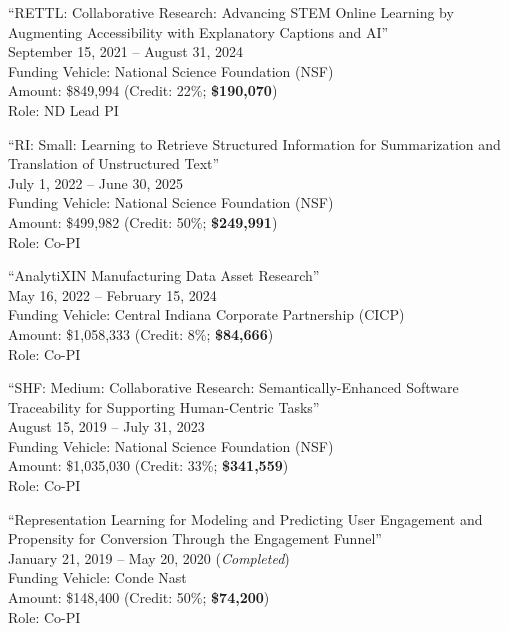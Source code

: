 \documentclass[10pt]{article}
\newenvironment{myindentpar}[1]%
{\begin{list}{}%
         {\setlength{\leftmargin}{#1}}%
         \item[]%
}
{\end{list}}
\newcounter{list}
\begin{document}
\begin{myindentpar}{0.75cm}
\hspace{-0.75cm}``RETTL: Collaborative Research: Advancing STEM Online Learning by Augmenting Accessibility with Explanatory Captions and AI'' \\
September 15, 2021 -- August 31, 2024 \\
Funding Vehicle: National Science Foundation (NSF) \\
Amount: \$849,994 (Credit: 22\%; \textbf{\$190,070}) \\
Role: {ND Lead PI}

\hspace{-0.75cm}``RI: Small: Learning to Retrieve Structured Information for Summarization and Translation of Unstructured Text'' \\
July 1, 2022 -- June 30, 2025 \\
Funding Vehicle: National Science Foundation (NSF) \\
Amount: \$499,982 (Credit: 50\%; \textbf{\$249,991}) \\
Role: {Co-PI}

\hspace{-0.75cm}``AnalytiXIN Manufacturing Data Asset Research'' \\
May 16, 2022 -- February 15, 2024 \\
Funding Vehicle: Central Indiana Corporate Partnership (CICP) \\
Amount: \$1,058,333 (Credit: 8\%; \textbf{\$84,666}) \\
Role: {Co-PI}

\hspace{-0.75cm}``SHF: Medium: Collaborative Research: Semantically-Enhanced Software Traceability for Supporting Human-Centric Tasks'' \\
August 15, 2019 -- July 31, 2023 \\
Funding Vehicle: National Science Foundation (NSF) \\
Amount: \$1,035,030 (Credit: 33\%; \textbf{\$341,559}) \\
Role: {Co-PI}

\hspace{-0.75cm}``Representation Learning for Modeling and Predicting User Engagement and Propensity for Conversion Through the Engagement Funnel'' \\
January 21, 2019 -- May 20, 2020 (\emph{Completed}) \\
Funding Vehicle: Conde Nast \\
Amount: \$148,400 (Credit: 50\%; \textbf{\$74,200}) \\
Role: {Co-PI}


\end{myindentpar}
\end{document}

